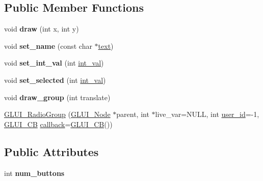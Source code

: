 \subsection*{Public Member Functions}
\begin{DoxyCompactItemize}
\item 
\hypertarget{classGLUI__RadioGroup_ac29a2b338b80e74267efb42f94b380e0}{void {\bfseries draw} (int x, int y)}\label{classGLUI__RadioGroup_ac29a2b338b80e74267efb42f94b380e0}

\item 
\hypertarget{classGLUI__RadioGroup_a8a3caea1aa9f603fae4ceab1c4e1b83a}{void {\bfseries set\-\_\-name} (const char $\ast$\hyperlink{classGLUI__Control_af0d60e9736f4dbc34e9a536e75876d72}{text})}\label{classGLUI__RadioGroup_a8a3caea1aa9f603fae4ceab1c4e1b83a}

\item 
\hypertarget{classGLUI__RadioGroup_a9dc08156997557c983d402682dd01557}{void {\bfseries set\-\_\-int\-\_\-val} (int \hyperlink{classGLUI__Control_a4a890b5b5a854b34200b5e63f1069b4e}{int\-\_\-val})}\label{classGLUI__RadioGroup_a9dc08156997557c983d402682dd01557}

\item 
\hypertarget{classGLUI__RadioGroup_ade83c982cd22902440bf1b5dcb3971ef}{void {\bfseries set\-\_\-selected} (int \hyperlink{classGLUI__Control_a4a890b5b5a854b34200b5e63f1069b4e}{int\-\_\-val})}\label{classGLUI__RadioGroup_ade83c982cd22902440bf1b5dcb3971ef}

\item 
\hypertarget{classGLUI__RadioGroup_a5feb3d5983d432a037e7fed7ebd7f3c0}{void {\bfseries draw\-\_\-group} (int translate)}\label{classGLUI__RadioGroup_a5feb3d5983d432a037e7fed7ebd7f3c0}

\item 
\hyperlink{classGLUI__RadioGroup_a36c19d4c90c003ca6f49de004be96a90}{G\-L\-U\-I\-\_\-\-Radio\-Group} (\hyperlink{classGLUI__Node}{G\-L\-U\-I\-\_\-\-Node} $\ast$parent, int $\ast$live\-\_\-var=N\-U\-L\-L, int \hyperlink{classGLUI__Control_a6c88b7c72b0800f88a5d4cda4868c8b6}{user\-\_\-id}=-\/1, \hyperlink{classGLUI__CB}{G\-L\-U\-I\-\_\-\-C\-B} \hyperlink{classGLUI__Control_a96060fe0cc6d537e736dd6eef78e24ab}{callback}=\hyperlink{classGLUI__CB}{G\-L\-U\-I\-\_\-\-C\-B}())
\end{DoxyCompactItemize}
\subsection*{Public Attributes}
\begin{DoxyCompactItemize}
\item 
\hypertarget{classGLUI__RadioGroup_a392b3c55c3951005a573491e5b555f35}{int {\bfseries num\-\_\-buttons}}\label{classGLUI__RadioGroup_a392b3c55c3951005a573491e5b555f35}

\end{DoxyCompactItemize}

